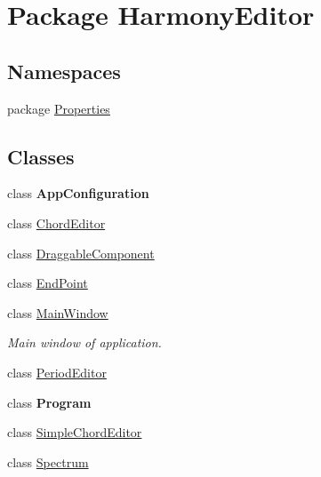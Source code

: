 \hypertarget{namespace_harmony_editor}{\section{Package Harmony\+Editor}
\label{namespace_harmony_editor}
}
\subsection*{Namespaces}
\begin{DoxyCompactItemize}
\item 
package \hyperlink{namespace_harmony_editor_1_1_properties}{Properties}
\end{DoxyCompactItemize}
\subsection*{Classes}
\begin{DoxyCompactItemize}
\item 
class {\bfseries App\+Configuration}
\item 
class \hyperlink{class_harmony_editor_1_1_chord_editor}{Chord\+Editor}
\item 
class \hyperlink{class_harmony_editor_1_1_draggable_component}{Draggable\+Component}
\item 
class \hyperlink{class_harmony_editor_1_1_end_point}{End\+Point}
\item 
class \hyperlink{class_harmony_editor_1_1_main_window}{Main\+Window}
\begin{DoxyCompactList}\small\item\em Main window of application. \end{DoxyCompactList}\item 
class \hyperlink{class_harmony_editor_1_1_period_editor}{Period\+Editor}
\item 
class {\bfseries Program}
\item 
class \hyperlink{class_harmony_editor_1_1_simple_chord_editor}{Simple\+Chord\+Editor}
\item 
class \hyperlink{class_harmony_editor_1_1_spectrum}{Spectrum}
\end{DoxyCompactItemize}
